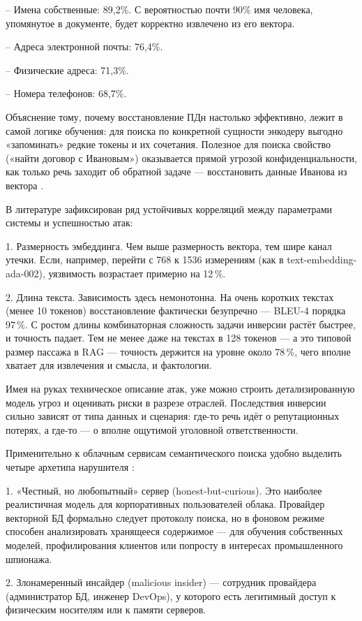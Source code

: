 \documentclass[a4paper, 12pt, oneside, openany]{article}
\begin{document}
-- Имена собственные: 89,2\%. С вероятностью почти 90\% имя человека, упомянутое в документе, будет корректно извлечено из его вектора.

-- Адреса электронной почты: 76,4\%.

-- Физические адреса: 71,3\%.

-- Номера телефонов: 68,7\%.

Объяснение тому, почему восстановление ПДн настолько эффективно, лежит в самой логике обучения: для поиска по конкретной сущности энкодеру выгодно «запоминать» редкие токены и их сочетания. Полезное для поиска свойство («найти договор с Ивановым») оказывается прямой угрозой конфиденциальности, как только речь заходит об обратной задаче — восстановить данные Иванова из вектора \cite{ref5}.

В литературе \cite{ref5} зафиксирован ряд устойчивых корреляций между параметрами системы и успешностью атак:

1. Размерность эмбеддинга. Чем выше размерность вектора, тем шире канал утечки. Если, например, перейти с 768 к 1536 измерениям (как в text-embedding-ada-002), уязвимость возрастает примерно на 12\,\%.

2. Длина текста. Зависимость здесь немонотонна. На очень коротких текстах (менее 10 токенов) восстановление фактически безупречно — BLEU-4 порядка 97\,\%. С ростом длины комбинаторная сложность задачи инверсии растёт быстрее, и точность падает. Тем не менее даже на текстах в 128 токенов — а это типовой размер пассажа в RAG — точность держится на уровне около 78\,\%, чего вполне хватает для извлечения и смысла, и фактологии.

Имея на руках техническое описание атак, уже можно строить детализированную модель угроз и оценивать риски в разрезе отраслей. Последствия инверсии сильно зависят от типа данных и сценария: где-то речь идёт о репутационных потерях, а где-то — о вполне ощутимой уголовной ответственности.

Применительно к облачным сервисам семантического поиска удобно выделить четыре архетипа нарушителя \cite{ref9}:

1. «Честный, но любопытный» сервер (honest-but-curious). Это наиболее реалистичная модель для корпоративных пользователей облака. Провайдер векторной БД формально следует протоколу поиска, но в фоновом режиме способен анализировать хранящееся содержимое — для обучения собственных моделей, профилирования клиентов или попросту в интересах промышленного шпионажа.

2. Злонамеренный инсайдер (malicious insider) — сотрудник провайдера (администратор БД, инженер DevOps), у которого есть легитимный доступ к физическим носителям или к памяти серверов.
\end{document}
